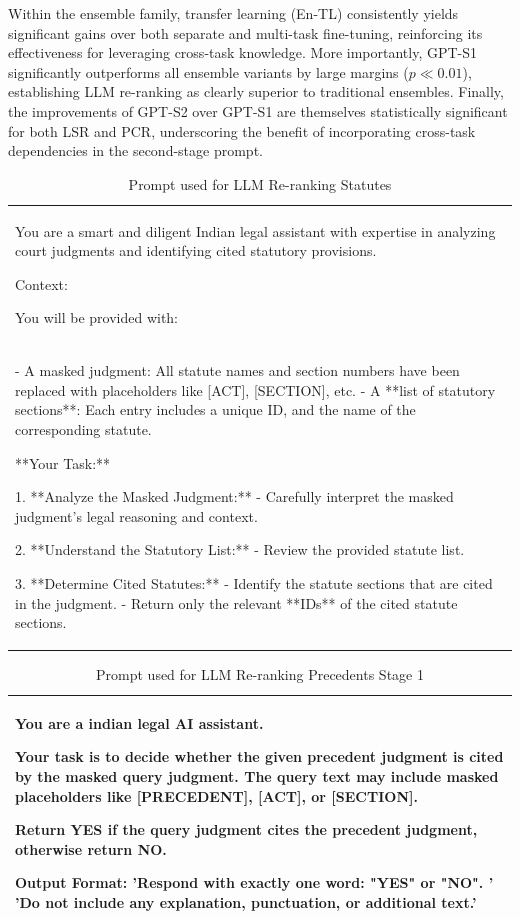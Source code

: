 \noindent Within the ensemble family, transfer learning (En-TL) consistently yields significant gains over both separate and multi-task fine-tuning, reinforcing its effectiveness for leveraging cross-task knowledge. More importantly, GPT-S1 significantly outperforms all ensemble variants by large margins ($p \ll 0.01$), establishing LLM re-ranking as clearly superior to traditional ensembles. Finally, the improvements of GPT-S2 over GPT-S1 are themselves statistically significant for both LSR and PCR, underscoring the benefit of incorporating cross-task dependencies in the second-stage prompt.


\begin{table}
    \centering
    \begin{tabular}{|p{}|}
    \hline
    You are a smart and diligent Indian legal assistant with expertise in analyzing court judgments and identifying cited statutory provisions.

Context:

You will be provided with: \\
- A masked judgment: All statute names and section numbers have been replaced with placeholders like [ACT], [SECTION], etc.
- A **list of statutory sections**: Each entry includes a unique ID, and the name of the corresponding statute.

**Your Task:**

1. **Analyze the Masked Judgment:**
   - Carefully interpret the masked judgment's legal reasoning and context.

2. **Understand the Statutory List:**
   - Review the provided statute list. 

3. **Determine Cited Statutes:**
   - Identify the statute sections that are cited  in the judgment.
   - Return only the relevant **IDs** of the cited statute sections.\\
    \hline
    \end{tabular}
    \caption{Prompt used for LLM Re-ranking Statutes }
    \label{tab:qry-stat-rerank}
\end{table}

\begin{table}
    \centering
    \begin{tabular}{|p{}|}
    \hline
    You are a indian legal AI assistant.

Your task is to decide whether the given precedent judgment is cited by the masked query judgment. The query text may include masked placeholders like [PRECEDENT], [ACT], or [SECTION].

Return YES if the query judgment cites the precedent judgment, otherwise return NO. 

Output Format:
'Respond with exactly one word: "YES" or "NO". '
'Do not include any explanation, punctuation, or additional text.'\\
    \hline
    \end{tabular}
    \caption{Prompt used for LLM Re-ranking Precedents Stage 1 }
    \label{tab:qry-prec-rerank1}
\end{table}

